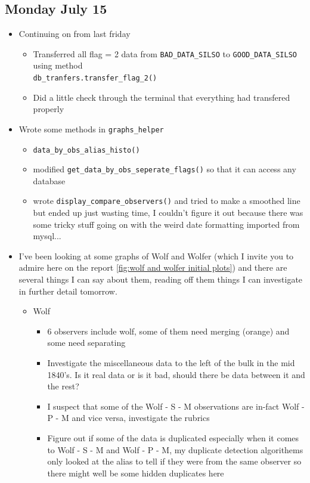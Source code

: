 \documentclass[12pt]{article}
\begin{document}
\subsection{Monday July 15}
\begin{itemize}
    \item Continuing on from last friday
    \begin{itemize}
        \item Transferred all flag = 2 data from \texttt{BAD\_DATA\_SILSO} to \texttt{GOOD\_DATA\_SILSO} using method \\\texttt{db\_tranfers.transfer\_flag\_2()}
        \item Did a little check through the terminal that everything had transfered properly
    \end{itemize}
    \item Wrote some methods in \texttt{graphs\_helper}
    \begin{itemize}
        \item \texttt{data\_by\_obs\_alias\_histo()}
        \item modified \texttt{get\_data\_by\_obs\_seperate\_flags()} so that it can access any database
        \item wrote \texttt{display\_compare\_observers()} and tried to make a smoothed line but ended up just wasting time, I couldn't figure it out because there was some tricky stuff going on with the weird date formatting imported from mysql...
    \end{itemize}
    \item I've been looking at some graphs of Wolf and Wolfer (which I invite you to admire here on the report \ref{fig:wolf and wolfer initial plots}) and there are several things I can say about them, reading off them things I can investigate in further detail tomorrow.
    \begin{itemize}
        \item Wolf
        \begin{itemize}
            \item 6 observers include wolf, some of them need merging (orange) and some need separating
            \item Investigate the miscellaneous data to the left of the bulk in the mid 1840's. Is it real data or is it bad, should there be data between it and the rest?
            \item I suspect that some of the Wolf - S - M observations are in-fact Wolf - P - M and vice versa, investigate the rubrics
            \item Figure out if some of the data is duplicated especially when it comes to Wolf - S - M and Wolf - P - M, my duplicate detection algorithems only looked at the alias to tell if they were from the same observer so there might well be some hidden duplicates here

\end{itemize}
\end{itemize}
\end{itemize}
\end{document}
